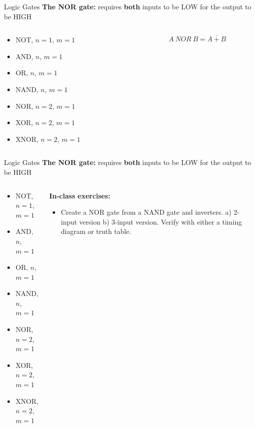 \documentclass{beamer}
\begin{document}
\begin{frame}{Logic Gates}
\textbf{The NOR gate:} requires \textbf{both} inputs to be LOW for the output to be HIGH \\ \vspace{0.5cm}
\begin{columns}[T]
\begin{column}{0.5\textwidth}
\begin{itemize}
\item \alert{NOT, $n=1$, $m=1$}
\item \alert{AND, $n$, $m=1$}
\item \alert{OR, $n$, $m=1$}
\item \alert{NAND, $n$, $m=1$}
\item \alert{NOR, $n=2$, $m=1$}
\item XOR, $n=2$, $m=1$
\item XNOR, $n=2$, $m=1$
\end{itemize}
\end{column}
\begin{column}{0.5\textwidth}
\begin{equation}
A ~ NOR ~ B = \overline{A+B}
\end{equation}
\end{column}
\end{columns}
\end{frame}

\begin{frame}{Logic Gates}
\textbf{The NOR gate:} requires \textbf{both} inputs to be LOW for the output to be HIGH \\ \vspace{0.5cm}
\begin{columns}[T]
\begin{column}{0.5\textwidth}
\begin{itemize}
\item \alert{NOT, $n=1$, $m=1$}
\item \alert{AND, $n$, $m=1$}
\item \alert{OR, $n$, $m=1$}
\item \alert{NAND, $n$, $m=1$}
\item \alert{NOR, $n=2$, $m=1$}
\item XOR, $n=2$, $m=1$
\item XNOR, $n=2$, $m=1$
\end{itemize}
\end{column}
\begin{column}{0.5\textwidth}
\textbf{In-class exercises:}
\begin{itemize}
\item Create a NOR gate from a NAND gate and inverters.  a) 2-input version b) 3-input version.  Verify with either a timing diagram or truth table.
\end{itemize}
\end{column}
\end{columns}
\end{frame}
\end{document}
